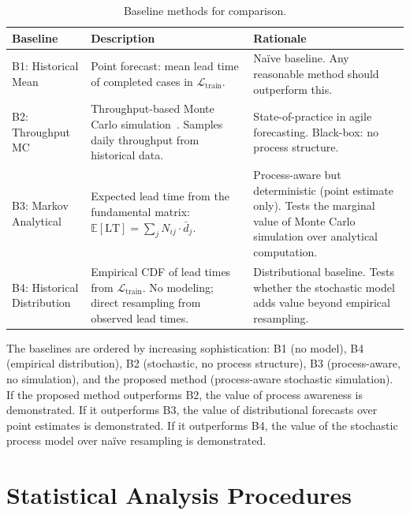 \begin{table}[htbp]
\centering
\caption{Baseline methods for comparison.}
\label{tab:baselines}
\small
\begin{tabular}{lp{4cm}p{5cm}}
\toprule
\textbf{Baseline} & \textbf{Description} & \textbf{Rationale} \\
\midrule
B1: Historical Mean & 
    Point forecast: mean lead time of completed cases in 
    $\mathcal{L}_{\text{train}}$. & 
    Na\"ive baseline. Any reasonable method should outperform this. \\
\midrule
B2: Throughput MC & 
    Throughput-based Monte Carlo 
    simulation~\cite{vacanti2015, savage2009flaw,magennis2011forecasting}. Samples daily 
    throughput from historical data. & 
    State-of-practice in agile forecasting. Black-box: no 
    process structure. \\
\midrule
B3: Markov Analytical & 
    Expected lead time from the fundamental matrix: 
    $\mathbb{E}[\text{LT}] = \sum_j N_{ij} \cdot \bar{d}_j$. & 
    Process-aware but deterministic (point estimate only). 
    Tests the marginal value of Monte Carlo simulation over 
    analytical computation. \\
\midrule
B4: Historical Distribution & 
    Empirical CDF of lead times from 
    $\mathcal{L}_{\text{train}}$. No modeling; direct 
    resampling from observed lead times. & 
    Distributional baseline. Tests whether the stochastic model 
    adds value beyond empirical resampling. \\
\bottomrule
\end{tabular}
\end{table}

The baselines are ordered by increasing sophistication: B1 (no model), 
B4 (empirical distribution), B2 (stochastic, no process structure), 
B3 (process-aware, no simulation), and the proposed method (process-aware 
stochastic simulation). If the proposed method outperforms B2, the 
value of process awareness is demonstrated. If it outperforms B3, the 
value of distributional forecasts over point estimates is demonstrated. 
If it outperforms B4, the value of the stochastic process model over 
na\"ive resampling is demonstrated.


\section{Statistical Analysis Procedures}
\label{sec:statistical-analysis}


